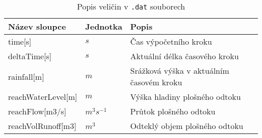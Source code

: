 


\begin{table}[h!]
 

 \centering
 \caption{Popis veličin  v {\tt.dat} souborech}
\label{tab:vystupytokdat}

 \begin{tabular}{llp{}}
  \hline  \hline
 Název sloupce        & Jednotka     & Popis                                      \\ 
 \hline
 time[s]              &   $s$         &  Čas výpočetního kroku                    \\
 deltaTime[s]         &   $s$         &  Aktuální délka časového kroku            \\
 rainfall[m]          &  $m$          &  Srážková výška v aktuálním časovém kroku \\
 reachWaterLevel[m]        &  $m$          &  Výška hladiny plošného odtoku            \\
 reachFlow[m3/s]              &  $m^3s^{-1}$  &  Průtok plošného odtoku                   \\
 reachVolRunoff[m3]                  &  $m^3$     & Odteklý objem plošného odtoku     \\
  \hline
 \end{tabular}

\end{table}

% 
% 
